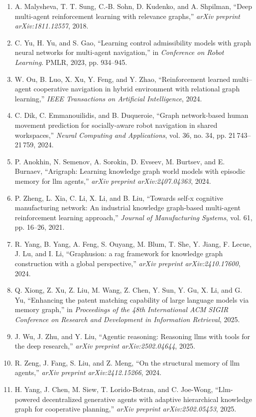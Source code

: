 \documentclass[10pt,UTF8,fontset=fandol]{ctexart}
\begin{document}
\begin{enumerate}[leftmargin=2.4em,labelsep=0.4em,itemsep=0.15em]
\item A. Malysheva, T. T. Sung, C.-B. Sohn, D. Kudenko, and A. Shpilman, ``Deep multi-agent reinforcement learning with relevance graphs,'' \textit{arXiv preprint arXiv:1811.12557}, 2018.
\item C. Yu, H. Yu, and S. Gao, ``Learning control admissibility models with graph neural networks for multi-agent navigation,'' in \textit{Conference on Robot Learning}. PMLR, 2023, pp. 934--945.
\item W. Ou, B. Luo, X. Xu, Y. Feng, and Y. Zhao, ``Reinforcement learned multi--agent cooperative navigation in hybrid environment with relational graph learning,'' \textit{IEEE Transactions on Artificial Intelligence}, 2024.
\item C. Dik, C. Emmanouilidis, and B. Duqueroie, ``Graph network-based human movement prediction for socially-aware robot navigation in shared workspaces,'' \textit{Neural Computing and Applications}, vol. 36, no. 34, pp. 21\,743--21\,759, 2024.
\item P. Anokhin, N. Semenov, A. Sorokin, D. Evseev, M. Burtsev, and E. Burnaev, ``Arigraph: Learning knowledge graph world models with episodic memory for llm agents,'' \textit{arXiv preprint arXiv:2407.04363}, 2024.
\item P. Zheng, L. Xia, C. Li, X. Li, and B. Liu, ``Towards self-x cognitive manufacturing network: An industrial knowledge graph-based multi-agent reinforcement learning approach,'' \textit{Journal of Manufacturing Systems}, vol. 61, pp. 16--26, 2021.
\item R. Yang, B. Yang, A. Feng, S. Ouyang, M. Blum, T. She, Y. Jiang, F. Lecue, J. Lu, and I. Li, ``Graphusion: a rag framework for knowledge graph construction with a global perspective,'' \textit{arXiv preprint arXiv:2410.17600}, 2024.
\item Q. Xiong, Z. Xu, Z. Liu, M. Wang, Z. Chen, Y. Sun, Y. Gu, X. Li, and G. Yu, ``Enhancing the patent matching capability of large language models via memory graph,'' in \textit{Proceedings of the 48th International ACM SIGIR Conference on Research and Development in Information Retrieval}, 2025.
\item J. Wu, J. Zhu, and Y. Liu, ``Agentic reasoning: Reasoning llms with tools for the deep research,'' \textit{arXiv preprint arXiv:2502.04644}, 2025.
\item R. Zeng, J. Fang, S. Liu, and Z. Meng, ``On the structural memory of llm agents,'' \textit{arXiv preprint arXiv:2412.15266}, 2024.
\item H. Yang, J. Chen, M. Siew, T. Lorido-Botran, and C. Joe-Wong, ``Llm-powered decentralized generative agents with adaptive hierarchical knowledge graph for cooperative planning,'' \textit{arXiv preprint arXiv:2502.05453}, 2025.

\end{enumerate}
\end{document}
